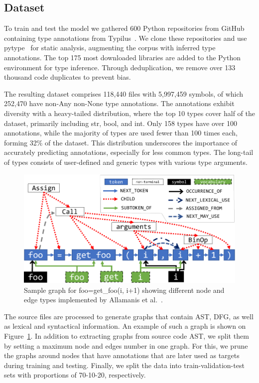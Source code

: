 \subsection{Dataset}\label{subsec:dataset}

To train and test the model we gathered 600 Python repositories from GitHub containing type annotations from Typilus~\cite{allamanis2020typilus}.
We clone these repositories and use pytype~\cite{PyType} for static analysis, augmenting the corpus with inferred type annotations.
The top 175 most downloaded libraries are added to the Python environment for type inference.
Through deduplication, we remove over 133 thousand code duplicates to prevent bias.

The resulting dataset comprises 118,440 files with 5,997,459 symbols, of which 252,470 have non-Any non-None type annotations.
The annotations exhibit diversity with a heavy-tailed distribution, where the top 10 types cover half of the dataset, primarily including str, bool, and int.
Only 158 types have over 100 annotations, while the majority of types are used fewer than 100 times each, forming 32\% of the dataset.
This distribution underscores the importance of accurately predicting annotations, especially for less common types.
The long-tail of types consists of user-defined and generic types with various type arguments.

\begin{figure}[t]
    \centering
    \includegraphics[width=0.75\columnwidth]{figures/samplegraph.pdf}
    \caption{Sample graph for foo=get\_foo(i, i+1) showing different node and edge types implemented by Allamanis et al.~\cite{allamanis2020typilus}.}
    \label{fig:samplegraph}
\end{figure}

The source files are processed to generate graphs that contain AST, DFG, as well as lexical and syntactical information.
An example of such a graph is shown on Figure~\ref{fig:samplegraph}.
In addition to extracting graphs from source code AST, we split them by setting a maximum node and edges number in one graph.
For this, we prune the graphs around nodes that have annotations that are later used as targets during training and testing.
Finally, we split the data into train-validation-test sets with proportions of 70-10-20, respectively.

